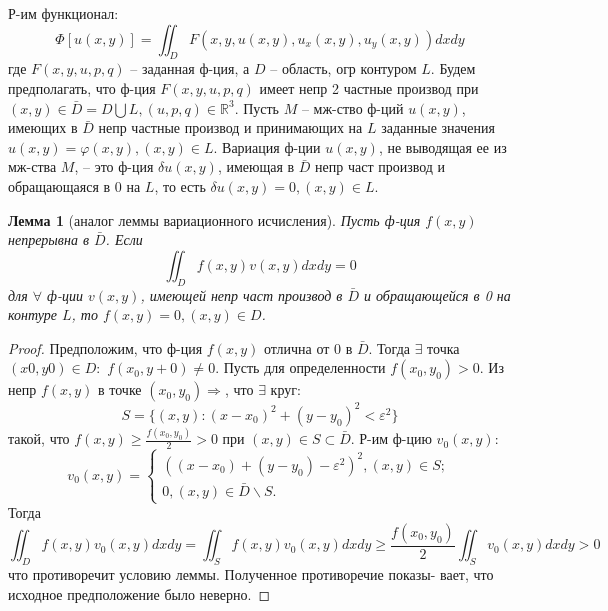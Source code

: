 \documentclass{article}
\newtheorem{lemma}{Лемма}
\begin{document}
Р-им функционал:
\begin{equation}
    \Phi[u(x, y)]=\iint_D F(x, y, u(x, y), u_x(x, y), u_y(x, y))dxdy
    \label{func2}
\end{equation}
где $F(x, y, u, p, q)$ – заданная ф-ция, а $D$ – область, огр контуром $L$. Будем предполагать, что ф-ция $F(x, y, u, p, q)$ имеет непр 2 частные производ при $(x, y) \in \bar D = D \bigcup L, (u, p, q) \in \mathbb{R}^3$. Пусть $M$ – мж-ство ф-ций $u(x, y)$, имеющих в $\bar D$ непр частные производ и принимающих на $L$ заданные значения $u(x, y) = \varphi(x, y),(x, y) \in L$. Вариация ф-ции $u(x, y)$, не выводящая ее из мж-ства $M$, – это ф-ция $\delta u(x, y)$, имеющая в $\bar D$ непр част производ и обращающаяся в 0 на $L$, то есть $\delta u(x, y) = 0,(x, y) \in L$.

\begin{lemma}[аналог леммы вариационного исчисления]
    Пусть ф-ция $f(x, y)$ непрерывна в $\bar D$. Если
    $$\iint_D f(x,y)v(x,y)dxdy=0$$
    для $\forall$ ф-ции $v(x, y)$, имеющей непр част производ в $\bar D$ и обращающейся в 0 на контуре $L$, то $f(x, y) = 0, (x, y) \in D$.
\end{lemma}
\begin{proof}
    Предположим, что ф-ция $f(x, y)$ отлична от 0
    в $\bar D$. Тогда $\exists$ точка $(x0, y0) \in D:$ $f(x_0, y+0)\neq0$. Пусть
    для определенности $f(x_0, y_0) > 0$. Из непр $f(x, y)$ в точке $(x_0, y_0)\Longrightarrow$, что $\exists$ круг: $$S = \{(x, y) : (x-x_0)^2 + (y-y_0)^2 < \varepsilon^2\}$$
    такой, что $f(x,y) \geq \frac{f(x_0,y_0)}{2}>0$ при $(x,y)\in S \subset \bar D$. Р-им ф-цию $v_0(x,y):$
    $$v_0(x,y)=\begin{cases}
        ((x-x_0) + (y-y_0)-\varepsilon^2)^2,  (x, y) \in S;\\
        0, (x,y)\in \bar D\backslash S.
    \end{cases}$$
    Тогда $$\iint_D f(x,y)v_0(x,y)dxdy=\iint_S f(x,y)v_0(x,y)dxdy \geq \frac{f(x_0,y_0)}{2}\iint_S v_0(x,y)dxdy>0$$
    что противоречит условию леммы. Полученное противоречие показы-
    вает, что исходное предположение было неверно.
\end{proof}
\end{document}
